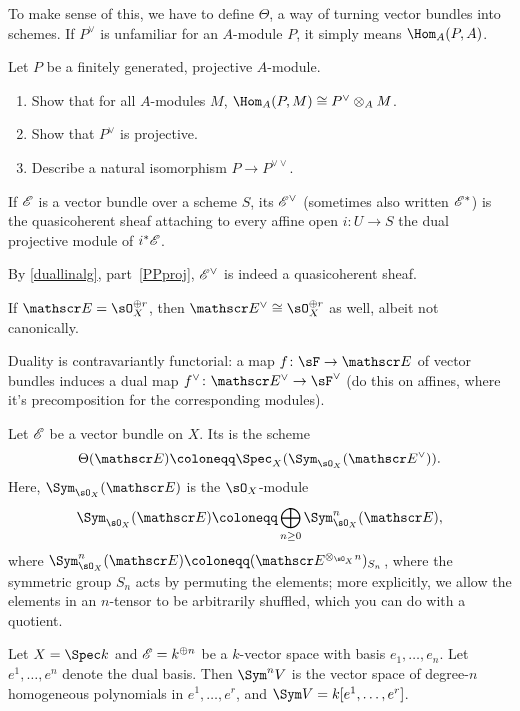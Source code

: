 To make sense of this, we have to define $\Theta$, a way of turning vector bundles into schemes. If $P^\vee$ is
unfamiliar for an $A$-module $P$, it simply means $\Hom_A(P, A)$.
\begin{ex}
\label{duallinalg}
Let $P$ be a finitely generated, projective $A$-module.
\begin{enumerate}
	\item\label{PPproj} Show that for all $A$-modules $M$, $\Hom_A(P,M)\cong P^\vee\otimes_A M$.
	\item Show that $P^\vee$ is projective.
	\item Describe a natural isomorphism $P\to P^{\vee\vee}$.
\end{enumerate}
\end{ex}
\begin{defn}
If $\mathscr E$ is a vector bundle over a scheme $S$, its  $\mathscr E^\vee$ (sometimes also written
$\mathscr E^*$) is the quasicoherent sheaf attaching to every affine open $i\colon U\to S$ the dual projective module of
$i^*\mathscr E$.
\end{defn}
By \cref{duallinalg}, part~\eqref{PPproj}, $\mathscr E^\vee$ is indeed a quasicoherent sheaf.
\begin{exm}
If $\sE = \sO_X^{\oplus r}$, then $\sE^\vee\cong\sO_X^{\oplus r}$ as well, albeit not canonically.
\end{exm}
Duality is contravariantly functorial: a map $f\colon\sF\to\sE$ of vector bundles induces a dual map
$f^\vee\colon\sE^\vee\to\sF^\vee$ (do this on affines, where it's precomposition for the corresponding modules).
\begin{defn}
Let $\mathscr E$ be a vector bundle on $X$. Its  is the scheme
\begin{equation}
	\Theta(\sE)\coloneqq\Spec_X(\Sym_{\sO_X}(\sE^\vee)).
\end{equation}
Here, $\Sym_{\sO_X}(\sE)$ is the $\sO_X$-module
\begin{equation}
	\Sym_{\sO_X}(\sE)\coloneqq \bigoplus_{n\ge 0} \Sym^n_{\sO_X}(\sE),
\end{equation}
where $\Sym_{\sO_X}^n(\sE) \coloneqq (\sE^{\otimes_{\sO_X} n})_{S_n}$, where the symmetric group $S_n$ acts by
permuting the elements; more explicitly, we allow the elements in an $n$-tensor to be arbitrarily shuffled, which
you can do with a quotient.
\end{defn}
\begin{exm}
Let $X = \Spec k$ and $\mathscr E = k^{\oplus n}$ be a $k$-vector space with basis $e_1,\dotsc,e_n$. Let $e^1,\dotsc,e^n$
denote the dual basis. Then $\Sym^n V$ is the vector space of degree-$n$ homogeneous polynomials in
$e^1,\dotsc,e^r$, and $\Sym V = k[e^1,\dotsc,e^r]$.
\end{exm}
